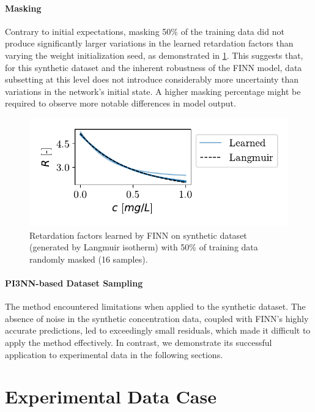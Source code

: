 \paragraph{Masking}
Contrary to initial expectations, masking 50\% of the training data did not produce significantly larger variations in the learned retardation factors than varying the weight initialization seed, as demonstrated in \cref{fig:synthetic_SPAN_losspattern}. This suggests that, for this synthetic dataset and the inherent robustness of the FINN model, data subsetting at this level does not introduce considerably more uncertainty than variations in the network's initial state. A higher masking percentage might be required to observe more notable differences in model output.

\begin{figure}[h]
    \centering
    \includegraphics{figs/finn_synthetic_SPAN_losspattern.pdf}
    \caption{Retardation factors learned by FINN on synthetic dataset (generated by Langmuir isotherm) with 50\% of training data randomly masked (16 samples).}
    \label{fig:synthetic_SPAN_losspattern}
\end{figure}

\paragraph{PI3NN-based Dataset Sampling}
The method encountered limitations when applied to the synthetic dataset. The absence of noise in the synthetic concentration data, coupled with FINN's highly accurate predictions, led to exceedingly small residuals, which made it difficult to apply the method effectively. In contrast, we demonstrate its successful application to experimental data in the following sections.



\section{Experimental Data Case}

